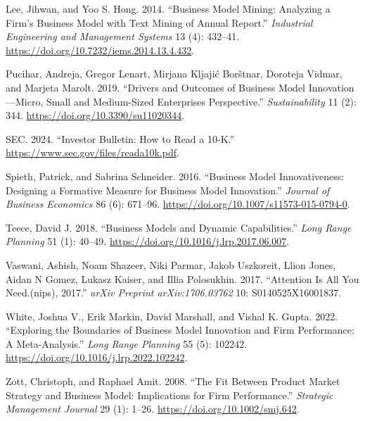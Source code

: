 \documentclass[
]{article}
\newlength{\cslhangindent}
\newenvironment{CSLReferences}[2] %
 {\begin{list}{}{%
  \setlength{\itemindent}{0pt}
  \setlength{\leftmargin}{0pt}
  \setlength{\parsep}{0pt}
  \ifodd #1
   \setlength{\leftmargin}{\cslhangindent}
   \setlength{\itemindent}{-1\cslhangindent}
  \fi
  \setlength{\itemsep}{#2\baselineskip}}}
 {\end{list}}
\begin{document}
\begin{CSLReferences}{1}{0}
Lee, Jihwan, and Yoo S. Hong. 2014. {``Business {Model} {Mining}:
{Analyzing} a {Firm}'s {Business} {Model} with {Text} {Mining} of
{Annual} {Report}.''} \emph{Industrial Engineering and Management
Systems} 13 (4): 432--41.
\url{https://doi.org/10.7232/iems.2014.13.4.432}.

Pucihar, Andreja, Gregor Lenart, Mirjana Kljajić Borštnar, Doroteja
Vidmar, and Marjeta Marolt. 2019. {``Drivers and {Outcomes} of
{Business} {Model} {Innovation}---{Micro}, {Small} and {Medium}-{Sized}
{Enterprises} {Perspective}.''} \emph{Sustainability} 11 (2): 344.
\url{https://doi.org/10.3390/su11020344}.

SEC. 2024. {``Investor {Bulletin}: {How} to {Read} a 10-{K}.''}
\url{https://www.sec.gov/files/reada10k.pdf}.

Spieth, Patrick, and Sabrina Schneider. 2016. {``Business Model
Innovativeness: Designing a Formative Measure for Business Model
Innovation.''} \emph{Journal of Business Economics} 86 (6): 671--96.
\url{https://doi.org/10.1007/s11573-015-0794-0}.

Teece, David J. 2018. {``Business Models and Dynamic Capabilities.''}
\emph{Long Range Planning} 51 (1): 40--49.
\url{https://doi.org/10.1016/j.lrp.2017.06.007}.

Vaswani, Ashish, Noam Shazeer, Niki Parmar, Jakob Uszkoreit, Llion
Jones, Aidan N Gomez, Lukasz Kaiser, and Illia Polosukhin. 2017.
{``Attention Is All You Need.(nips), 2017.''} \emph{arXiv Preprint
arXiv:1706.03762} 10: S0140525X16001837.

White, Joshua V., Erik Markin, David Marshall, and Vishal K. Gupta.
2022. {``Exploring the Boundaries of Business Model Innovation and Firm
Performance: {A} Meta-Analysis.''} \emph{Long Range Planning} 55 (5):
102242. \url{https://doi.org/10.1016/j.lrp.2022.102242}.

Zott, Christoph, and Raphael Amit. 2008. {``The Fit Between Product
Market Strategy and Business Model: Implications for Firm
Performance.''} \emph{Strategic Management Journal} 29 (1): 1--26.
\url{https://doi.org/10.1002/smj.642}.

\end{CSLReferences}
\end{document}
